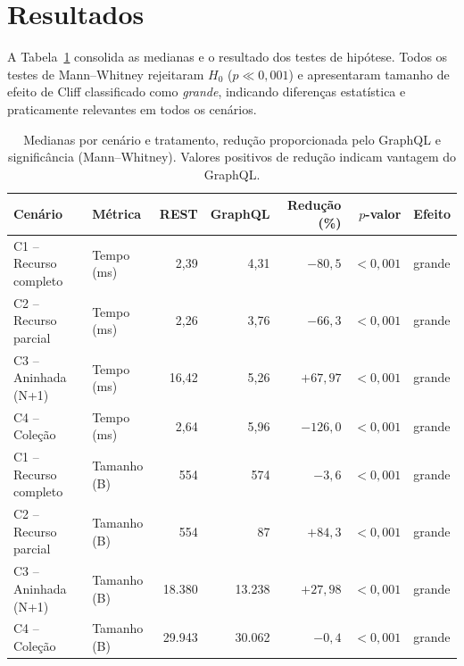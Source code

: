 \documentclass[conference]{IEEEtran}
\begin{document}
\section{Resultados}
A Tabela~\ref{tab:resumo} consolida as medianas e o resultado dos testes de
hipótese. Todos os testes de Mann--Whitney rejeitaram $H_0$
($p \ll 0{,}001$) e apresentaram tamanho de efeito de Cliff classificado como
\textit{grande}, indicando diferenças estatística e praticamente relevantes em
todos os cenários.

\begin{table}[t]
\centering
\caption{Medianas por cenário e tratamento, redução proporcionada pelo GraphQL
e significância (Mann--Whitney). Valores positivos de redução indicam vantagem
do GraphQL.}
\label{tab:resumo}
\begin{tabular}{llrrrrl}
\toprule
\textbf{Cenário} & \textbf{Métrica} & \textbf{REST} & \textbf{GraphQL} &
\textbf{Redução (\%)} & \textbf{$p$-valor} & \textbf{Efeito} \\
\midrule
C1 -- Recurso completo & Tempo (ms)   & 2{,}39   & 4{,}31   & $-80{,}5$  & $<0{,}001$ & grande \\
C2 -- Recurso parcial  & Tempo (ms)   & 2{,}26   & 3{,}76   & $-66{,}3$  & $<0{,}001$ & grande \\
C3 -- Aninhada (N+1)   & Tempo (ms)   & 16{,}42  & 5{,}26   & $+67{,}97$ & $<0{,}001$ & grande \\
C4 -- Coleção          & Tempo (ms)   & 2{,}64   & 5{,}96   & $-126{,}0$ & $<0{,}001$ & grande \\
\midrule
C1 -- Recurso completo & Tamanho (B)  & 554      & 574      & $-3{,}6$   & $<0{,}001$ & grande \\
C2 -- Recurso parcial  & Tamanho (B)  & 554      & 87       & $+84{,}3$  & $<0{,}001$ & grande \\
C3 -- Aninhada (N+1)   & Tamanho (B)  & 18.380   & 13.238   & $+27{,}98$ & $<0{,}001$ & grande \\
C4 -- Coleção          & Tamanho (B)  & 29.943   & 30.062   & $-0{,}4$   & $<0{,}001$ & grande \\
\bottomrule
\end{tabular}
\end{table}
\end{document}
